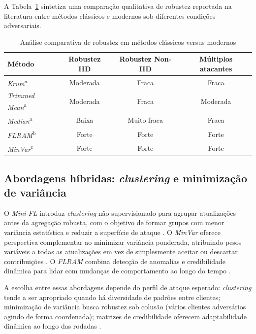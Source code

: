 A Tabela~\ref{tab:comparacao-robustez} sintetiza uma comparação qualitativa de robustez reportada na literatura entre métodos clássicos e modernos sob diferentes condições adversariais.

\begin{table}[htbp]
    \centering
    \caption{Análise comparativa de robustez em métodos clássicos versus modernos}
    \label{tab:comparacao-robustez}
    \begin{tabular}{lccc}
        \hline
        \textbf{Método} & \textbf{Robustez IID} & \textbf{Robustez Non-IID} & \textbf{Múltiplos atacantes} \\
        \hline
        \textit{Krum}\textsuperscript{a} & Moderada & Fraca & Fraca \\
        \textit{Trimmed Mean}\textsuperscript{a} & Moderada & Fraca & Moderada \\
        \textit{Median}\textsuperscript{a} & Baixa & Muito fraca & Fraca \\
        \textit{FLRAM}\textsuperscript{b} & Forte & Forte & Forte \\
        \textit{MinVar}\textsuperscript{c} & Forte & Forte & Forte \\
        \hline
    \end{tabular}
\end{table}

\subsection{Abordagens híbridas: \textit{clustering} e minimização de variância}
\label{subsec:abordagens-hibridas}

O \textit{Mini-FL} introduz \textit{clustering} não supervisionado para agrupar atualizações antes da agregação robusta, com o objetivo de formar grupos com menor variância estatística e reduzir a superfície de ataque \cite{Li2023}. O \textit{MinVar} oferece perspectiva complementar ao minimizar variância ponderada, atribuindo pesos variáveis a todas as atualizações em vez de simplesmente aceitar ou descartar contribuições \cite{Xu2024}. O \textit{FLRAM} combina detecção de anomalias e credibilidade dinâmica para lidar com mudanças de comportamento ao longo do tempo \cite{Chen2023}.

A escolha entre essas abordagens depende do perfil de ataque esperado: \textit{clustering} tende a ser apropriado quando há diversidade de padrões entre clientes; minimização de variância busca robustez sob colusão (vários clientes adversários agindo de forma coordenada); matrizes de credibilidade oferecem adaptabilidade dinâmica ao longo das rodadas \cite{Chen2023,Li2023,Xu2024}.

